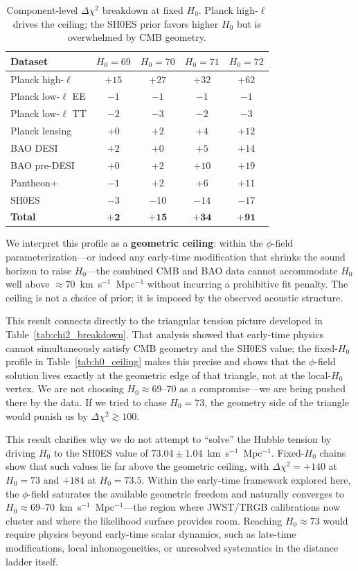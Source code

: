 \documentclass[a4paper,11pt]{article}
\begin{document}
\begin{table}[ht]
\centering
\caption{Component-level $\Delta\chi^2$ breakdown at fixed $H_0$. Planck high-$\ell$ drives the ceiling; the SH0ES prior favors higher $H_0$ but is overwhelmed by CMB geometry.}
\label{tab:ceiling_breakdown}
\begin{tabular}{lcccc}
\toprule
Dataset & $H_0=69$ & $H_0=70$ & $H_0=71$ & $H_0=72$ \\
\midrule
Planck high-$\ell$ & $+15$ & $+27$ & $+32$ & $+62$ \\
Planck low-$\ell$ EE & $-1$ & $-1$ & $-1$ & $-1$ \\
Planck low-$\ell$ TT & $-2$ & $-3$ & $-2$ & $-3$ \\
Planck lensing & $+0$ & $+2$ & $+4$ & $+12$ \\
BAO DESI & $+2$ & $+0$ & $+5$ & $+14$ \\
BAO pre-DESI & $+0$ & $+2$ & $+10$ & $+19$ \\
Pantheon+ & $-1$ & $+2$ & $+6$ & $+11$ \\
SH0ES & $-3$ & $-10$ & $-14$ & $-17$ \\
\midrule
\textbf{Total} & $\mathbf{+2}$ & $\mathbf{+15}$ & $\mathbf{+34}$ & $\mathbf{+91}$ \\
\bottomrule
\end{tabular}
\end{table}

We interpret this profile as a \textbf{geometric ceiling}: within the $\phi$-field parameterization---or indeed any early-time modification that shrinks the sound horizon to raise $H_0$---the combined CMB and BAO data cannot accommodate $H_0$ well above $\approx 70$~km~s$^{-1}$~Mpc$^{-1}$ without incurring a prohibitive fit penalty. The ceiling is not a choice of prior; it is imposed by the observed acoustic structure.

This result connects directly to the triangular tension picture developed in Table~\ref{tab:chi2_breakdown}. That analysis showed that early-time physics cannot simultaneously satisfy CMB geometry and the SH0ES value; the fixed-$H_0$ profile in Table~\ref{tab:h0_ceiling} makes this precise and shows that the $\phi$-field solution lives exactly at the geometric edge of that triangle, not at the local-$H_0$ vertex. We are not choosing $H_0 \approx 69$--$70$ as a compromise---we are being pushed there by the data. If we tried to chase $H_0 = 73$, the geometry side of the triangle would punish us by $\Delta\chi^2 \gtrsim 100$.

This result clarifies why we do not attempt to ``solve'' the Hubble tension by driving $H_0$ to the SH0ES value of $73.04 \pm 1.04$~km~s$^{-1}$~Mpc$^{-1}$. Fixed-$H_0$ chains show that such values lie far above the geometric ceiling, with $\Delta\chi^2 = +140$ at $H_0 = 73$ and $+184$ at $H_0 = 73.5$. Within the early-time framework explored here, the $\phi$-field saturates the available geometric freedom and naturally converges to $H_0 \approx 69$--$70$~km~s$^{-1}$~Mpc$^{-1}$---the region where JWST/TRGB calibrations now cluster and where the likelihood surface provides room. Reaching $H_0 \approx 73$ would require physics beyond early-time scalar dynamics, such as late-time modifications, local inhomogeneities, or unresolved systematics in the distance ladder itself.
\end{document}
